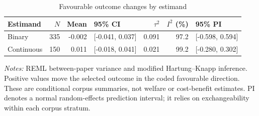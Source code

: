 \begin{table}[htbp]\centering\small
\caption{Favourable outcome changes by estimand}\label{tab:pooled}
\setlength{\tabcolsep}{4pt}
\begin{tabular}{lrrlrrl}\toprule
Estimand & $N$ & Mean & 95\% CI & $\tau^2$ & $I^2$ (\%) & 95\% PI \\
\midrule
Binary & 335 & -0.002 & [-0.041, 0.037] & 0.091 & 97.2 & [-0.598, 0.594] \\
Continuous & 150 & 0.011 & [-0.018, 0.041] & 0.021 & 99.2 & [-0.280, 0.302] \\
\bottomrule\end{tabular}
\par\vspace{4pt}\begin{minipage}{\textwidth}\footnotesize
\textit{Notes:} REML between-paper variance and modified Hartung--Knapp inference. Positive values move the selected outcome in the coded favourable direction. These are conditional corpus summaries, not welfare or cost-benefit estimates. PI denotes a normal random-effects prediction interval; it relies on exchangeability within each corpus stratum.
\end{minipage}
\end{table}
